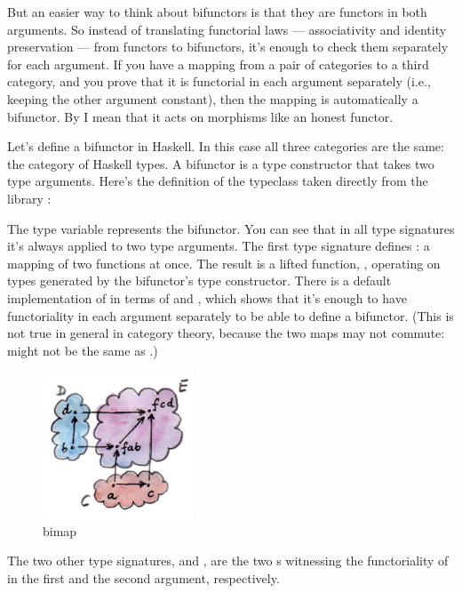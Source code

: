 But an easier way to think about bifunctors is that they are functors in
both arguments. So instead of translating functorial laws ---
associativity and identity preservation --- from functors to bifunctors,
it's enough to check them separately for each argument. If you have a
mapping from a pair of categories to a third category, and you prove
that it is functorial in each argument separately (i.e., keeping the
other argument constant), then the mapping is automatically a bifunctor.
By  I mean that it acts on morphisms like an honest
functor.

Let's define a bifunctor in Haskell. In this case all three categories
are the same: the category of Haskell types. A bifunctor is a type
constructor that takes two type arguments. Here's the definition of the
 typeclass taken directly from the library
:

The type variable  represents the bifunctor. You can see that
in all type signatures it's always applied to two type arguments. The
first type signature defines : a mapping of two functions
at once. The result is a lifted function,
, operating on types
generated by the bifunctor's type constructor. There is a default
implementation of  in terms of  and
, which shows that it's enough to have functoriality in
each argument separately to be able to define a bifunctor.  (This is not true in general in category theory, because the two maps may not commute:  might not be the same as .)

\begin{figure}[H]
\centering\includegraphics[width=0.4\textwidth]{images/bimap.jpg}
\caption{bimap}
\end{figure}

\noindent
The two other type signatures,  and , are
the two s witnessing the functoriality of  in the
first and the second argument, respectively.

